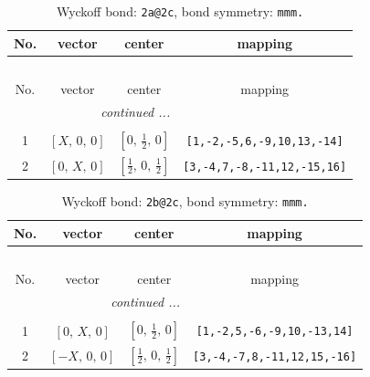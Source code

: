 \documentclass[fleqn,8pt]{jsarticle}
\begin{document}
\begin{longtable}{cccc}
\caption{Wyckoff bond: {\tt 2a@2c}, bond symmetry: {\tt mmm.}}
 \\
 \hline \hline
No. & vector & center & mapping \\ \hline \endfirsthead

\multicolumn{3}{l}{\tablename\ \thetable{}} \\
 \hline \hline
No. & vector & center & mapping \\ \hline \endhead

 \hline \hline
\multicolumn{3}{r}{\footnotesize\it continued ...} \\ \endfoot

 \hline \hline
\multicolumn{3}{r}{} \\ \endlastfoot

1 & $\left[ X,\, 0,\, 0 \right]$ & $\left[ 0,\, \frac{1}{2},\, 0 \right]$ & {\tt [1,-2,-5,6,-9,10,13,-14]} \\ \hline
2 & $\left[ 0,\, X,\, 0 \right]$ & $\left[ \frac{1}{2},\, 0,\, \frac{1}{2} \right]$ & {\tt [3,-4,7,-8,-11,12,-15,16]} \\
\end{longtable}
\renewcommand{\arraystretch}{1.2}
\begin{longtable}{cccc}
\caption{Wyckoff bond: {\tt 2b@2c}, bond symmetry: {\tt mmm.}}
 \\
 \hline \hline
No. & vector & center & mapping \\ \hline \endfirsthead

\multicolumn{3}{l}{\tablename\ \thetable{}} \\
 \hline \hline
No. & vector & center & mapping \\ \hline \endhead

 \hline \hline
\multicolumn{3}{r}{\footnotesize\it continued ...} \\ \endfoot

 \hline \hline
\multicolumn{3}{r}{} \\ \endlastfoot

1 & $\left[ 0,\, X,\, 0 \right]$ & $\left[ 0,\, \frac{1}{2},\, 0 \right]$ & {\tt [1,-2,5,-6,-9,10,-13,14]} \\ \hline
2 & $\left[ - X,\, 0,\, 0 \right]$ & $\left[ \frac{1}{2},\, 0,\, \frac{1}{2} \right]$ & {\tt [3,-4,-7,8,-11,12,15,-16]} \\
\end{longtable}
\renewcommand{\arraystretch}{1.2}
\end{document}
